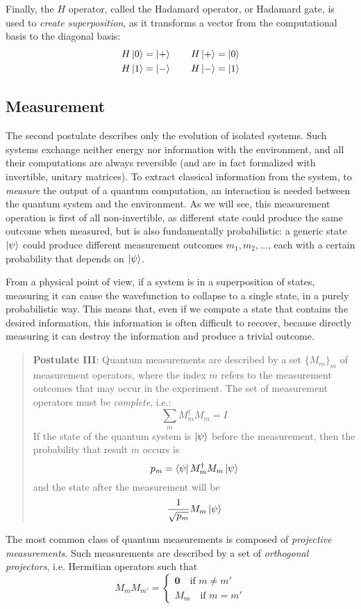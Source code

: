  
Finally, the $H$ operator, called the Hadamard operator, or Hadamard gate, is used to \textit{create superposition}, as it transforms a vector from the computational basis to the diagonal basis:
\begin{gather*}
	H\ket{0} = \ket{+} \qquad H\ket{+} = \ket{0}  \\
	H\ket{1} = \ket{-} \qquad H\ket{-} = \ket{1} \\	 
\end{gather*}
\subsection{Measurement}

The second postulate describes only the evolution of isolated systems. Such systems exchange neither energy nor information with the environment, and all their computations are always reversible (and are in fact formalized with invertible, unitary matrices). To extract classical information from the system, to \textit{measure} the output of a quantum computation, an interaction is needed between the quantum system and the environment. As we will see, this measurement operation is first of all non-invertible, as different state could produce the same outcome when measured, but is also fundamentally probabilistic: a generic state $\ket{\psi}$ could produce different measurement outcomes $m_1, m_2,\ldots$, each with a certain probability that depends on $\ket{\psi}$.

From a physical point of view, if a system is in a superposition of states, measuring it can  cause the wavefunction to collapse to a single state, in a purely probabilistic way. This means that, even if we compute a state that contains the desired information, this information is often difficult to recover, because directly measuring  it can destroy the information and produce a trivial outcome.

\begin{quote} \textbf{Postulate III}: Quantum measurements are described by a set $\{M_m\}_m$ of measurement operators, where the index $m$ refers to the measurement outcomes that may occur in the experiment. The set of measurement operators must be \textit{complete}, i.e.:
\[\sum_m M_m^\dagger M_m = I\]
If the state of the quantum system is $\ket{\psi}$ before the measurement, then the probability that result $m$ occurs is 
\[p_m = \bra{\psi}M_m^\dagger M_m\ket{\psi}\]
and the state after the measurement will be \[\frac{1}{\sqrt{p_m}}M_m\ket{\psi}\]
\end{quote}

The most common class of quantum measurements is composed of \textit{projective measurements}. Such measurements are described by a set of \textit{orthogonal projectors}, i.e. Hermitian operators such that \[ M_mM_{m'} = \begin{cases}\mathbf{0}\quad\text{if } m \neq m' \\ M_m\quad\text{if }m = m'\end{cases}\]


